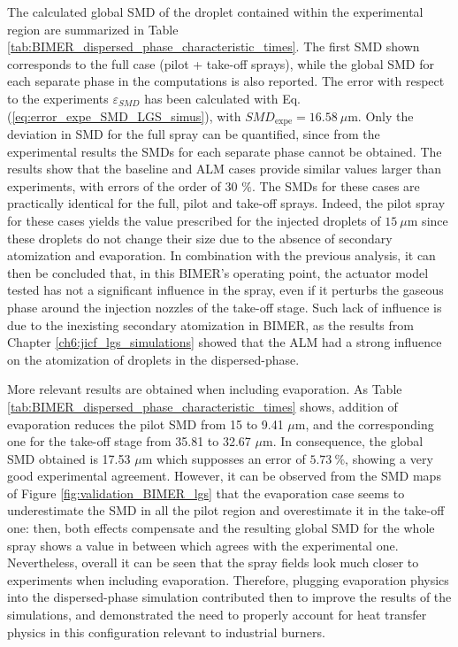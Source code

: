 The calculated global SMD of the droplet contained within the experimental region are summarized in Table \ref{tab:BIMER_dispersed_phase_characteristic_times}.  The first SMD shown corresponds to the full case (pilot + take-off sprays), while the global SMD for each separate phase in the computations is also reported.  The error with respect to the experiments $\varepsilon_{SMD}$ has been calculated with Eq. (\ref{eq:error_expe_SMD_LGS_simus}), with $SMD_\mathrm{expe} = 16.58~\mu$m. Only the deviation in SMD for the full spray can be quantified, since from the experimental results the SMDs for each separate phase cannot be obtained. The results show that the baseline and ALM cases provide similar values larger than experiments, with errors of the order of 30 $\%$. The SMDs for these cases are practically identical for the full, pilot and take-off sprays. Indeed, the pilot spray for these cases yields the value prescribed for the injected droplets of $15~\mu$m since these droplets do not change their size due to the absence of secondary atomization and evaporation. In combination with the previous analysis, it can then be concluded that, in this BIMER's operating point, the actuator model tested has not a significant influence in the spray, even if it perturbs the gaseous phase around the injection nozzles of the take-off stage. Such lack of influence is due to the inexisting secondary atomization in BIMER, as the results from Chapter \ref{ch6:jicf_lgs_simulations} showed that the ALM had a strong influence on the atomization of droplets in the dispersed-phase. 

More relevant results are obtained when including evaporation. As Table \ref{tab:BIMER_dispersed_phase_characteristic_times} shows, addition of evaporation reduces the pilot SMD from 15 to 9.41 $\mu$m, and the corresponding one for the take-off stage from 35.81 to 32.67 $\mu$m. In consequence, the global SMD obtained is 17.53 $\mu$m which supposses an error of $5.73~\%$, showing a very good experimental agreement. However, it can be observed from the SMD maps of Figure \ref{fig:validation_BIMER_lgs} that the evaporation case seems to underestimate the SMD in all the pilot region and overestimate it in the take-off one: then, both effects compensate and the resulting global SMD for the whole spray shows a value in between which agrees with the experimental one. Nevertheless, overall it can be seen that the spray fields look much closer to experiments when including evaporation. Therefore, plugging evaporation physics into the dispersed-phase simulation contributed then to improve the results of the simulations, and demonstrated the need to properly account for heat transfer physics in this configuration relevant to industrial burners.



